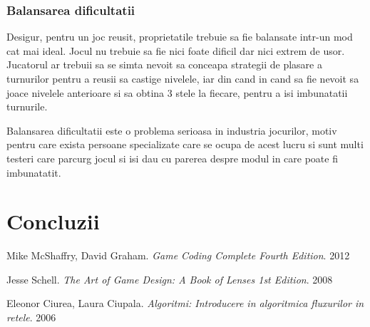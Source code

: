 \documentclass[12pt, a4paper]{article}
\begin{document}
	
	
	\subsubsection{Balansarea dificultatii}
	
	Desigur, pentru un joc reusit, proprietatile trebuie sa fie balansate intr-un mod cat mai ideal. Jocul nu trebuie sa fie nici foate dificil dar nici extrem de usor. Jucatorul ar trebuii sa se simta nevoit sa conceapa strategii de plasare a turnurilor pentru a reusii sa castige nivelele, iar din cand in cand sa fie nevoit sa joace nivelele anterioare si sa obtina 3 stele la fiecare, pentru a isi imbunatatii turnurile.
	\newline
	
	Balansarea dificultatii este o problema serioasa in industria jocurilor, motiv pentru care exista persoane specializate care se ocupa de acest lucru si sunt multi testeri care parcurg jocul si isi dau cu parerea despre modul in care poate fi imbunatatit.
	
	
	
	
	
	\section{Concluzii}
	
	
	
	\pagebreak
	\begin{thebibliography}{3}
		Mike McShaffry, David Graham. \newline
		\textit{Game Coding Complete Fourth Edition}. 2012
		
		Jesse Schell.  \newline
		\textit{The Art of Game Design: A Book of Lenses 1st Edition}. 2008
		
		Eleonor Ciurea, Laura Ciupala.  \newline
		\textit{Algoritmi: Introducere in algoritmica fluxurilor in retele}. 2006
		
		
	\end{thebibliography}
	
	
\end{document}
